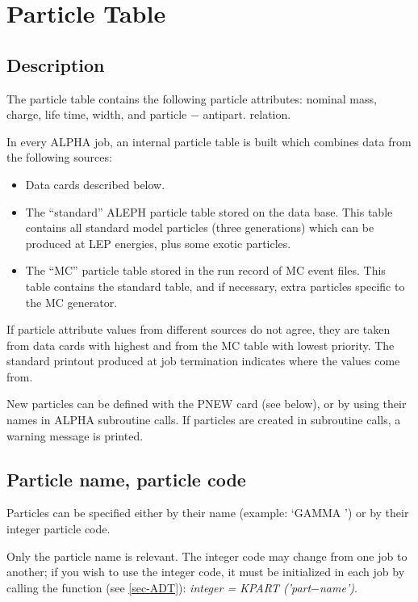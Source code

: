 \chapter{\label{sec-PT} Particle Table}
\par
\section{\label{sec-PTD}Description}
\par
The particle table contains the following particle attributes:
nominal mass, charge, life time, width, and particle $-$ antipart.
relation.
\par
In every ALPHA job, an internal particle table is built which combines
data from the following sources:
\begin{itemize}
\item Data cards described below.
\item The ``standard'' ALEPH particle table stored on the data base.
This table contains all standard model particles (three generations)
which can be produced at LEP energies, plus some exotic particles.
\item The ``MC'' particle table stored in the run record of MC event
files.
This table contains the standard table, and if necessary, extra
particles specific to the MC generator.
\end{itemize}
If particle attribute values from different sources do not agree,
they
are taken from data cards with highest and from the MC table with
lowest priority. The standard printout produced at job termination
indicates where the values come from.
\par
New particles can be defined with the PNEW card (see below), or
by using their names in ALPHA
subroutine calls. If particles are created in subroutine calls,
a warning message is printed.
\par
\section{\label{sec-PTN}Particle name, particle code}
\par
Particles can be specified either by their name (example:
`GAMMA ') or by their integer particle code.
\begin{indentlist}{ 2.50cm}{ 2.75cm}
Only the particle name is relevant.
The integer
code may change from
one job to another; if you wish to use the integer code,
it must be initialized in each job
by calling the function (see \ref{sec-ADT}):{\it
integer = KPART ('part$-$name')}.
\end{indentlist}
